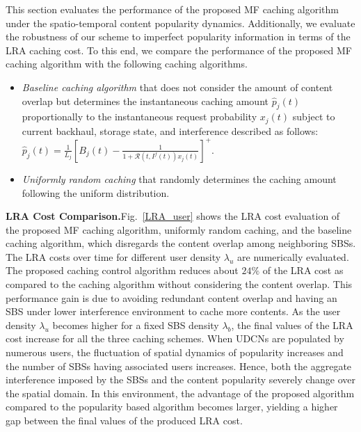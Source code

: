\documentclass{book}
\newcommand{\tred}[1]{\textcolor{red}{#1}}
\begin{document}
            This section evaluates the performance of the proposed MF caching algorithm under the spatio-temporal content popularity dynamics. 
            Additionally, we evaluate the robustness of our scheme to imperfect popularity information in terms of the LRA caching cost.
            To this end, we compare the performance of the proposed MF caching algorithm with the following caching algorithms.
            \begin{itemize}
            \item {\it Baseline caching algorithm} that   does not consider the amount of content overlap but determines the instantaneous caching amount $\hat{p}_{j}(t)$ proportionally to the instantaneous request probability $x_j(t)$ subject to current backhaul, storage state, and interference described as follows: 
            $\hat{p}_{j}(t)=\frac{1}{L_j}\left[B_{j}(t)- \frac{1}{1+\mathcal{R}(t,I^f(t)) x_j(t)   } \right]^+$. 
            \item {\it Uniformly random caching} that randomly determines the caching amount following the uniform distribution.
            \end{itemize}
            
            
            \textbf{LRA Cost Comparison.}\quad Fig.~\ref{LRA_user} shows the LRA cost evaluation of the proposed MF caching algorithm, uniformly random caching, and the baseline caching  algorithm, which disregards the content overlap among neighboring SBSs.
             The LRA costs over time for different user density $\lambda_u$ are numerically evaluated. The proposed caching control algorithm reduces about $24\%$ of the LRA cost as compared to the caching algorithm without considering the content overlap. This performance gain is due to avoiding redundant content overlap and having an SBS under lower interference environment to cache more contents. As the user density $\lambda_u$ becomes higher for a fixed SBS density $\lambda_b$, the final values of the LRA cost increase for all the three caching schemes. When UDCNs are populated by numerous users, the fluctuation of  spatial dynamics of popularity increases and the number of  SBSs having associated users increases. 
            Hence, both the aggregate interference imposed by the SBSs and the content popularity severely change over the spatial domain. In this environment,  the advantage of the proposed algorithm compared to the popularity based algorithm becomes larger, yielding a  higher gap between the final values of the produced LRA cost. 
            
\end{document}

